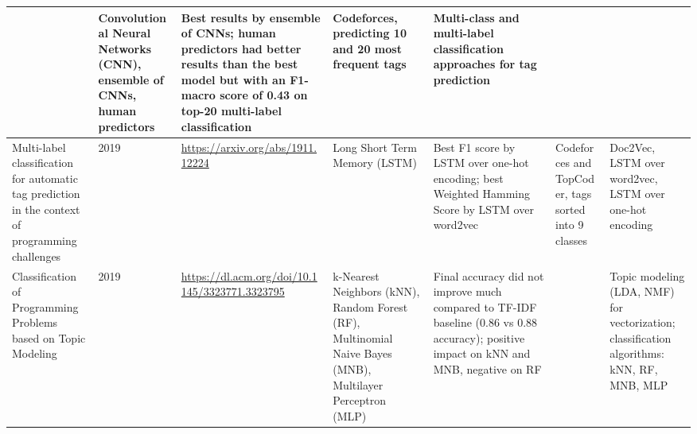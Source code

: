 \documentclass{article}
\begin{document}
\begin{itemize}
\begin{longtable}{|p{2cm}|p{0.8cm}|p{2cm}|p{2cm}|p{3cm}|p{2cm}|p{3cm}|}
              
                             & Convolutional Neural Networks (CNN), ensemble of CNNs, human predictors 
                             & Best results by ensemble of CNNs; human predictors had better results than the best model but with an F1-macro score of 0.43 on top-20 multi-label classification 
                             & Codeforces, predicting 10 and 20 most frequent tags 
                             & Multi-class and multi-label classification approaches for tag prediction                                                                                                                                                                                       \\
              
              \hline
              Multi-label classification for automatic tag prediction in the context of programming challenges
                             & 2019
                             & \href{https://arxiv.org/abs/1911.12224}{\url{https://arxiv.org/abs/1911.12224}}

              
              
              
              
              
                             & Long Short Term Memory (LSTM)
                             & Best F1 score by LSTM over one-hot encoding; best Weighted Hamming Score by LSTM over word2vec 
                             & Codeforces and TopCoder, tags sorted into 9 classes 
                             & Doc2Vec, LSTM over word2vec, LSTM over one-hot encoding                                                                                                                                                                                                        \\
              
              \hline
              Classification of Programming Problems based on Topic Modeling
                             & 2019
                             & \href{https://dl.acm.org/doi/10.1145/3323771.3323795}{\url{https://dl.acm.org/doi/10.1145/3323771.3323795}}

              
              
              
              
              
                             & k-Nearest Neighbors (kNN), Random Forest (RF), Multinomial Naive Bayes (MNB), Multilayer Perceptron (MLP) 
                             & Final accuracy did not improve much compared to TF-IDF baseline (0.86 vs 0.88 accuracy); positive impact on kNN and MNB, negative on RF 
                             & 
                             & Topic modeling (LDA, NMF) for vectorization; classification algorithms: kNN, RF, MNB, MLP                                                                                                                                                                      \\
              

\end{longtable}
\end{itemize}
\end{document}

